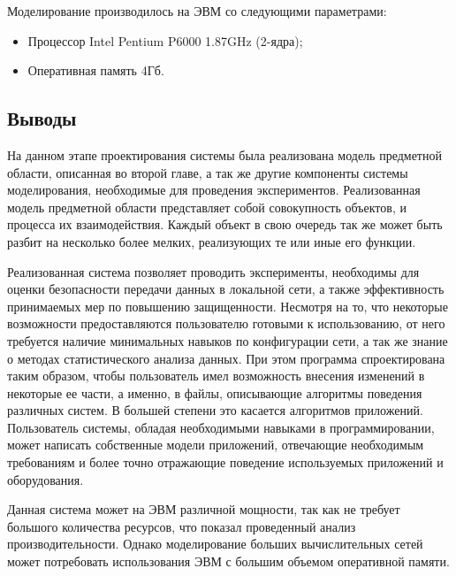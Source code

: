     Моделирование производилось на ЭВМ со следующими параметрами:

    \begin{itemize}
        \item Процессор Intel Pentium P6000 1.87GHz (2-ядра);
        \item Оперативная память 4Гб.
    \end{itemize}

    \subsection{Выводы}

    На данном этапе проектирования системы была реализована модель предметной области, описанная во второй главе, а так же другие компоненты системы моделирования, необходимые для проведения экспериментов. Реализованная модель предметной области представляет собой совокупность объектов, и процесса их взаимодействия. Каждый объект в свою очередь так же может быть разбит на несколько более мелких, реализующих те или иные его функции.

    Реализованная система позволяет проводить эксперименты, необходимы для оценки безопасности передачи данных в локальной сети, а также эффективность принимаемых мер по повышению защищенности. Несмотря на то, что некоторые возможности предоставляются пользователю готовыми к использованию, от него требуется наличие минимальных навыков по конфигурации сети, а так же знание о методах статистического анализа данных. При этом программа спроектирована таким образом, чтобы пользователь имел возможность внесения изменений в некоторые ее части, а именно, в файлы, описывающие алгоритмы поведения различных систем. В большей степени это касается алгоритмов приложений. Пользователь системы, обладая необходимыми навыками в программировании, может написать собственные модели приложений, отвечающие необходимым требованиям и более точно отражающие поведение используемых приложений и оборудования.

    Данная система может на ЭВМ различной мощности, так как не требует большого количества ресурсов, что показал проведенный анализ производительности. Однако моделирование больших вычислительных сетей может потребовать использования ЭВМ с большим объемом оперативной памяти. 